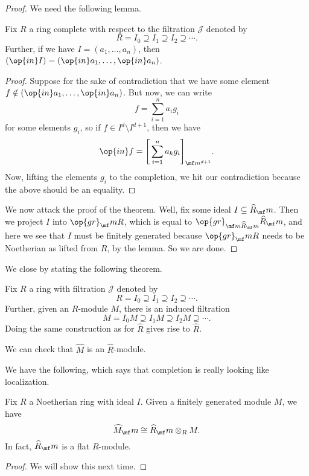 \begin{proof}
	We need the following lemma.
	\begin{lemma}
		Fix $R$ a ring complete with respect to the filtration $\mathcal J$ denoted by
		\[R=I_0\supseteq I_1\supseteq I_2\supseteq\cdots.\]
		Further, if we have $I=(a_1,\ldots,a_n)$, then $(\op{in}I)=(\op{in}a_1,\ldots,\op{in}a_n)$.
	\end{lemma}
	\begin{proof}
		Suppose for the sake of contradiction that we have some element $f\notin(\op{in}a_1,\ldots,\op{in}a_n)$. But now, we can write
		\[f=\sum_{i=1}^na_ig_i\]
		for some elements $g_i$, so if $f\in I^d\setminus I^{d+1}$, then we have
		\[\op{in}f=\Bigg[\sum_{i=1}^na_kg_i\Bigg]_{\mf m^{d+1}}.\]
		Now, lifting the elements $g_i$ to the completion, we hit our contradiction because the above should be an equality.
	\end{proof}
	We now attack the proof of the theorem. Well, fix some ideal $I\subseteq\widehat R_\mf m$. Then we project $I$ into $\op{gr}_\mf mR$, which is equal to $\op{gr}_{\mf m\widehat R_\mf m}\widehat R_\mf m$, and here we see that $I$ must be finitely generated because $\op{gr}_\mf mR$ needs to be Noetherian as lifted from $R$, by the lemma. So we are done.
\end{proof}
We close by stating the following theorem.
\begin{definition}
	Fix $R$ a ring with filtration $\mathcal J$ denoted by
	\[R=I_0\supseteq I_1\supseteq I_2\supseteq\cdots.\]
	Further, given an $R$-module $M$, there is an induced filtration
	\[M=I_0M\supseteq I_1M\supseteq I_2M\supseteq\cdots.\]
	Doing the same construction as for $\widehat R$ gives rise to $\widehat R$.
\end{definition}
We can check that $\widehat M$ is an $\widehat R$-module.

We have the following, which says that completion is really looking like localization.
\begin{theorem}
	Fix $R$ a Noetherian ring with ideal $I$. Given a finitely generated module $M$, we have
	\[\widehat M_\mf m\cong\widehat R_\mf m\otimes_RM.\]
	In fact, $\widehat R_\mf m$ is a flat $R$-module.
\end{theorem}
\begin{proof}
	We will show this next time.
\end{proof}